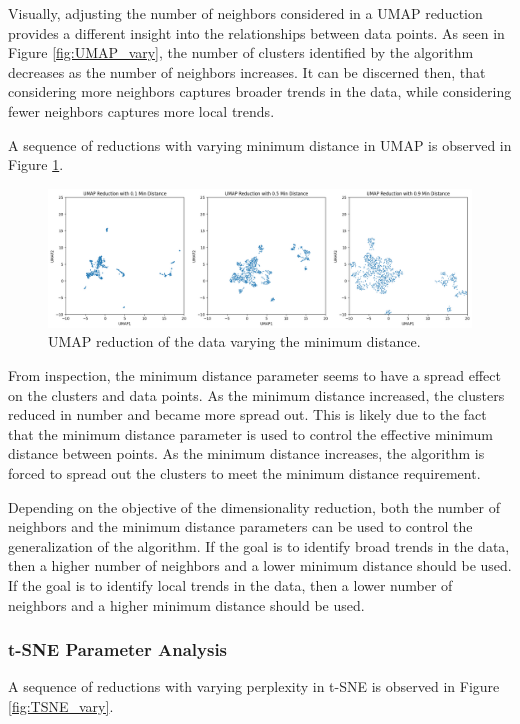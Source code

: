 \documentclass[12pt]{article}
\begin{document}
Visually, adjusting the number of neighbors considered in a UMAP reduction provides a different insight into the relationships between data points. As seen in Figure \ref{fig:UMAP_vary}, the number of clusters identified by the algorithm decreases as the number of neighbors increases. It can be discerned then, that considering more neighbors captures broader trends in the data, while considering fewer neighbors captures more local trends.

A sequence of reductions with varying minimum distance in UMAP is observed in Figure \ref{fig:UMAP_vary2}.

\begin{figure}[H]
    \centering
    \includegraphics[width=\textwidth]{Images/UMAP_vary2.png}
    \caption{UMAP reduction of the data varying the minimum distance.}
    \label{fig:UMAP_vary2}
\end{figure}

From inspection, the minimum distance parameter seems to have a spread effect on the clusters and data points. As the minimum distance increased, the clusters reduced in number and became more spread out. This is likely due to the fact that the minimum distance parameter is used to control the effective minimum distance between points. As the minimum distance increases, the algorithm is forced to spread out the clusters to meet the minimum distance requirement.

Depending on the objective of the dimensionality reduction, both the number of neighbors and the minimum distance parameters can be used to control the generalization of the algorithm. If the goal is to identify broad trends in the data, then a higher number of neighbors and a lower minimum distance should be used. If the goal is to identify local trends in the data, then a lower number of neighbors and a higher minimum distance should be used.

\subsubsection{t-SNE Parameter Analysis}
A sequence of reductions with varying perplexity in t-SNE is observed in Figure \ref{fig:TSNE_vary}.
\end{document}
